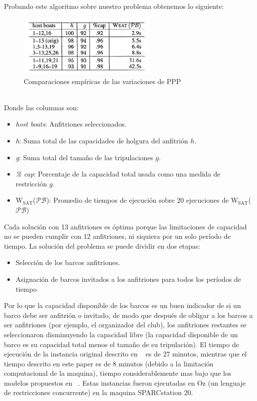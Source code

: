 \documentclass[letter, 10pt]{article}
\begin{document}
Probando este algoritmo sobre nuestro problema obtenemos lo siguiente:
\begin{figure}[ht]
\centering
 \includegraphics[width=0.6\textwidth]{party4.png}
 \caption{Comparaciones empíricas de las variaciones de PPP}
\end{figure}
\\
Donde las columnas son:

\begin{itemize}
\item \textit{host boats}: Anfitriones seleccionados.
\item \textit{h}: Suma total de las capacidades de holgura del anfitrión $h$.
\item \textit{g}: Suma total del tamaño de las tripulaciones $g$.
\item \textit{\% cap}: Porcentaje de la capacidad total usada como una medida de restricción $g$.
\item $\text{W}_{\text{SAT}}$($\mathcal{PB}$): Promedio de tiempos de ejecución sobre 20 ejecuciones de $\text{W}_{\text{SAT}}$($\mathcal{PB}$)
\end{itemize}

Cada solución con 13 anfitriones es óptima porque las limitaciones de capacidad no se pueden cumplir con 12 anfitriones, ni siquiera por un solo período de tiempo. La solución del problema se puede dividir en dos etapas: 

\begin{itemize}
    \item Selección de los barcos anfitriones.
    \item Asignación de barcos invitados a los anfitriones para todos los períodos de tiempo
\end{itemize}

Por lo que la capacidad disponible de los barcos es un buen indicador de si un barco debe ser anfitrión o invitado, de modo que después de obligar a los barcos a ser anfitriones (por ejemplo, el organizador del club), los anfitriones restantes se seleccionaron disminuyendo la capacidad libre (la capacidad disponible de un barco es su capacidad total menos el tamaño de su tripulación). El tiempo de ejecución de la instancia original descrito en ~\cite{Smith1996} es de 27 minutos, mientras que el tiempo descrito en este paper es de 8 minutos (debido a la limitación computacional de la maquina), tiempo considerablemente mas bajo que los modelos propuestos en ~\cite{Smith1996}. Estas instancias fueron ejecutadas en Oz (un lenguaje de restricciones concurrente) en la maquina SPARCstation 20.
\end{document}
